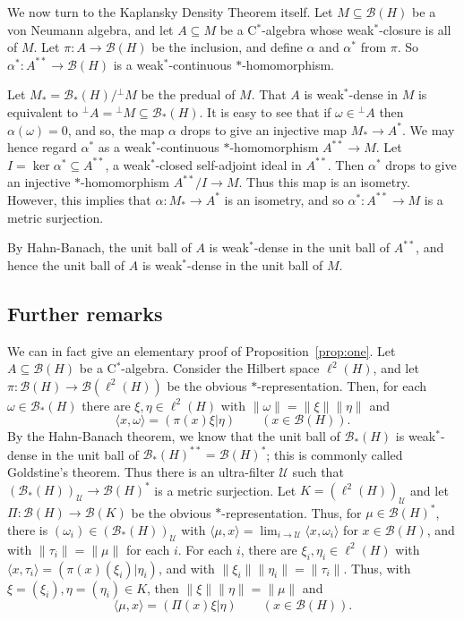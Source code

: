 \documentclass[a4paper,12pt]{article}
\theoremstyle{plain}
\theoremstyle{definition}
\newcommand{\mc}{\mathcal}
\newcommand{\ip}[2]{\langle{#1},{#2}\rangle}
\begin{document}
We now turn to the Kaplansky Density Theorem itself.  Let $M\subseteq\mc B(H)$
be a von Neumann algebra, and let $A\subseteq M$ be a C$^*$-algebra whose
weak$^*$-closure
is all of $M$.  Let $\pi:A\rightarrow\mc B(H)$ be the inclusion, and define $\alpha$
and $\alpha^*$ from $\pi$.  So $\alpha^*:A^{**}\rightarrow\mc B(H)$ is a
weak$^*$-continuous $*$-homomorphism.

Let $M_* = \mc B_*(H) / {}^\perp M$ be the predual of $M$.  That $A$ is weak$^*$-dense
in $M$ is equivalent to ${}^\perp A = {}^\perp M \subseteq \mc B_*(H)$.  It is
easy to see that if $\omega \in {}^\perp A$ then $\alpha(\omega)=0$, and so, the
map $\alpha$ drops to give an injective map $M_* \rightarrow A^*$.  We may hence
regard $\alpha^*$ as a weak$^*$-continuous $*$-homomorphism $A^{**} \rightarrow M$.
Let $I = \ker\alpha^* \subseteq A^{**}$, a weak$^*$-closed self-adjoint ideal in
$A^{**}$.  Then $\alpha^*$ drops to give an injective $*$-homomorphism
$A^{**} / I \rightarrow M$.  Thus this map is an isometry.  However, this implies
that $\alpha:M_* \rightarrow A^*$ is an isometry, and so $\alpha^*:A^{**}
\rightarrow M$ is a metric surjection.

By Hahn-Banach, the unit ball of $A$ is weak$^*$-dense in the unit ball of $A^{**}$,
and hence the unit ball of $A$ is weak$^*$-dense in the unit ball of $M$.


\subsection{Further remarks}

We can in fact give an elementary proof of Proposition~\ref{prop:one}.
Let $A\subseteq\mc B(H)$ be a C$^*$-algebra.  Consider the Hilbert space
$\ell^2(H)$, and let $\pi : \mc B(H) \rightarrow \mc B(\ell^2(H))$ be the
obvious $*$-representation.  Then, for each $\omega\in\mc B_*(H)$ there are
$\xi,\eta\in\ell^2(H)$ with $\|\omega\| = \|\xi\|\|\eta\|$ and
\[ \ip{x}{\omega} = (\pi(x)\xi|\eta) \qquad (x\in\mc B(H)). \]
By the Hahn-Banach theorem, we know that the unit ball of $\mc B_*(H)$ is weak$^*$-dense
in the unit ball of $\mc B_*(H)^{**} = \mc B(H)^*$; this is commonly called Goldstine's
theorem.  Thus there is an ultra-filter $\mc U$ such that $(\mc B_*(H))_{\mc U}
\rightarrow \mc B(H)^*$ is a metric surjection.  Let $K = (\ell^2(H))_{\mc U}$ and
let $\Pi:\mc B(H) \rightarrow\mc B(K)$ be the obvious $*$-representation.  Thus,
for $\mu \in \mc B(H)^*$, there is $(\omega_i) \in (\mc B_*(H))_{\mc U}$ with
$\ip{\mu}{x} = \lim_{i\rightarrow\mc U} \ip{x}{\omega_i}$ for $x\in\mc B(H)$, and
with $\|\tau_i\| = \|\mu\|$ for each $i$.  For each $i$, there are $\xi_i,\eta_i
\in \ell^2(H)$ with $\ip{x}{\tau_i} = (\pi(x)(\xi_i)|\eta_i)$, and with
$\|\xi_i\| \|\eta_i\| = \|\tau_i\|$.  Thus, with $\xi = (\xi_i), \eta = (\eta_i)\in K$,
then $\|\xi\| \|\eta\| = \|\mu\|$ and
\[ \ip{\mu}{x} = (\Pi(x)\xi|\eta) \qquad (x\in\mc B(H)). \]
\end{document}
